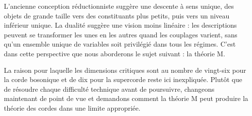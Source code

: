 L’ancienne conception réductionniste suggère une descente à sens unique, des objets de grande taille vers des constituants plus petits, puis vers un niveau inférieur unique. La dualité suggère une vision moins linéaire : les descriptions peuvent se transformer les unes en les autres quand les couplages varient, sans qu’un ensemble unique de variables soit privilégié dans tous les régimes. C’est dans cette perspective que nous aborderons le sujet suivant : la théorie M.

La raison pour laquelle les dimensions critiques sont au nombre de vingt-six pour la corde bosonique et de dix pour la supercorde reste ici inexpliquée. Plutôt que de résoudre chaque difficulté technique avant de poursuivre, changeons maintenant de point de vue et demandons comment la théorie M peut produire la théorie des cordes dans une limite appropriée.